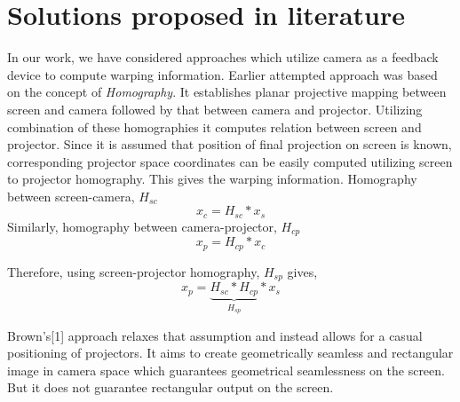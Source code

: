 \documentclass{article}
\begin{document}
\section{Solutions proposed in literature}
In our work, we have considered approaches which utilize camera as a feedback device to compute warping information. Earlier attempted approach was based on the concept of \textit{Homography}\cite{5}. It establishes planar projective mapping between screen and camera followed by that between camera and projector. Utilizing combination of these homographies it computes relation between screen and projector. Since it is assumed that position of final projection on screen is known, corresponding projector space coordinates can be easily computed utilizing screen to projector homography. This gives the warping information. \newline
Homography between screen-camera, $H_{sc}$
\begin{equation}
x_{c}=H_{sc}*x_{s}
\end{equation}
Similarly, homography between camera-projector, $H_{cp}$
\begin{equation}
x_{p}=H_{cp}*x_{c}
\end{equation}

Therefore, using screen-projector homography, $H_{sp}$ gives,
\begin{equation}
x_{p}=\underbrace{H_{sc}*H_{cp}}_{H_{sp}}*x_{s}
\end{equation}



Brown's[1] approach relaxes that assumption and instead allows for a casual positioning of projectors. It aims to create geometrically seamless and rectangular image in camera space which guarantees geometrical seamlessness on the screen. But it does not guarantee rectangular output on the screen. 
\end{document}
